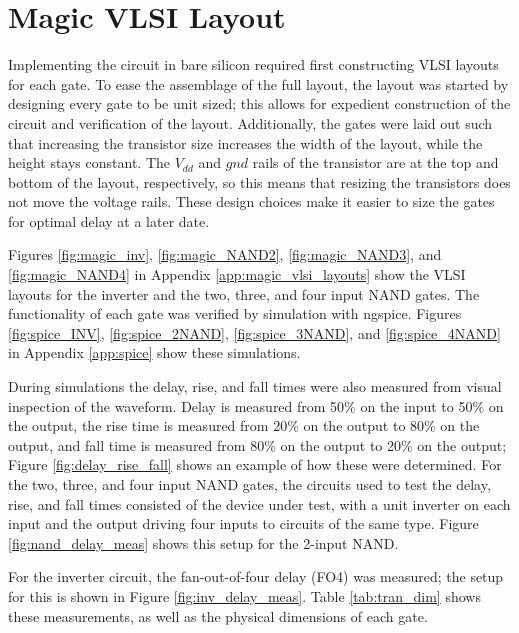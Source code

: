 \documentclass[12pt]{article}
\begin{document}
\section{Magic VLSI Layout}
Implementing the circuit in bare silicon required first constructing VLSI layouts for each gate.
To ease the assemblage of the full layout, the layout was started by designing every gate to be unit sized; this allows for expedient construction of the circuit and verification of the layout.
Additionally, the gates were laid out such that increasing the transistor size increases the width of the layout, while the height stays constant.
The \(V_{dd}\) and \(gnd\) rails of the transistor are at the top and bottom of the layout, respectively, so this means that resizing the transistors does not move the voltage rails.
These design choices make it easier to size the gates for optimal delay at a later date.

Figures \ref{fig:magic_inv}, \ref{fig:magic_NAND2}, \ref{fig:magic_NAND3}, and \ref{fig:magic_NAND4} in Appendix \ref{app:magic_vlsi_layouts} show the VLSI layouts for the inverter and the two, three, and four input NAND gates.
The functionality of each gate was verified by simulation with ngspice.
Figures \ref{fig:spice_INV}, \ref{fig:spice_2NAND}, \ref{fig:spice_3NAND}, and \ref{fig:spice_4NAND} in Appendix \ref{app:spice} show these simulations.

During simulations the delay, rise, and fall times were also measured from visual inspection of the waveform.
Delay is measured from 50\% on the input to 50\% on the output, the rise time is measured from 20\% on the output to 80\% on the output, and fall time is measured from 80\% on the output to 20\% on the output; Figure \ref{fig:delay_rise_fall} shows an example of how these were determined.
For the two, three, and four input NAND gates, the circuits used to test the delay, rise, and fall times consisted of the device under test, with a unit inverter on each input and the output driving four inputs to circuits of the same type.
Figure \ref{fig:nand_delay_meas} shows this setup for the 2-input NAND.

For the inverter circuit, the fan-out-of-four delay (FO4) was measured; the setup for this is shown in Figure \ref{fig:inv_delay_meas}.
Table \ref{tab:tran_dim} shows these measurements, as well as the physical dimensions of each gate.
\end{document}
